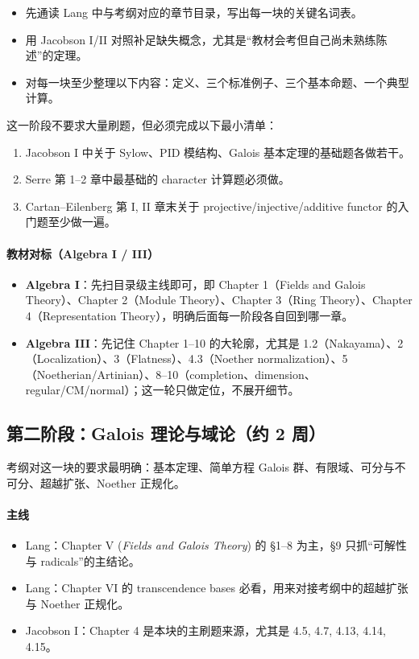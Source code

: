 \documentclass[12pt,a4paper]{ctexart}
\begin{document}
\begin{itemize}
  \item 先通读 Lang 中与考纲对应的章节目录，写出每一块的关键名词表。
  \item 用 Jacobson I/II 对照补足缺失概念，尤其是“教材会考但自己尚未熟练陈述”的定理。
  \item 对每一块至少整理以下内容：定义、三个标准例子、三个基本命题、一个典型计算。
\end{itemize}

这一阶段不要求大量刷题，但必须完成以下最小清单：
\begin{enumerate}
  \item Jacobson I 中关于 Sylow、PID 模结构、Galois 基本定理的基础题各做若干。
  \item Serre 第 1--2 章中最基础的 character 计算题必须做。
  \item Cartan--Eilenberg 第 I, II 章末关于 projective/injective/additive functor 的入门题至少做一遍。
\end{enumerate}

\paragraph{教材对标（Algebra I / III）}
\begin{itemize}
  \item \textbf{Algebra I}：先扫目录级主线即可，即 Chapter 1（Fields and Galois Theory）、Chapter 2（Module Theory）、Chapter 3（Ring Theory）、Chapter 4（Representation Theory），明确后面每一阶段各自回到哪一章。
  \item \textbf{Algebra III}：先记住 Chapter 1--10 的大轮廓，尤其是 1.2（Nakayama）、2（Localization）、3（Flatness）、4.3（Noether normalization）、5（Noetherian/Artinian）、8--10（completion、dimension、regular/CM/normal）；这一轮只做定位，不展开细节。
\end{itemize}

\subsection{第二阶段：Galois 理论与域论（约 2 周）}

考纲对这一块的要求最明确：基本定理、简单方程 Galois 群、有限域、可分与不可分、超越扩张、Noether 正规化。

\paragraph{主线}
\begin{itemize}
  \item Lang：Chapter V (\emph{Fields and Galois Theory}) 的 \S 1--8 为主，\S 9 只抓“可解性与 radicals”的主结论。
  \item Lang：Chapter VI 的 transcendence bases 必看，用来对接考纲中的超越扩张与 Noether 正规化。
  \item Jacobson I：Chapter 4 是本块的主刷题来源，尤其是 4.5, 4.7, 4.13, 4.14, 4.15。
\end{itemize}
\end{document}

